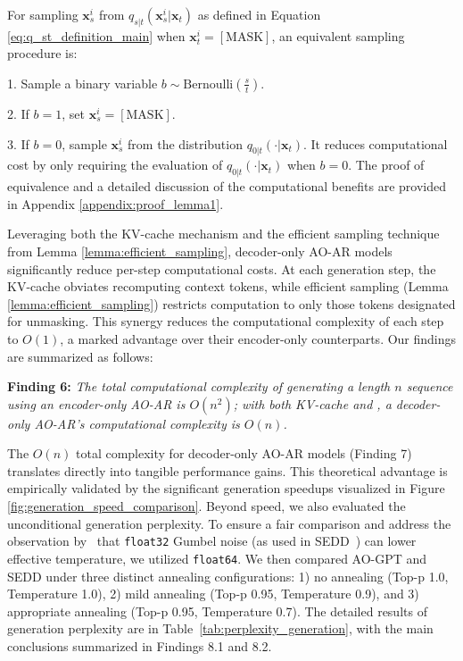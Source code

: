 \begin{lemma} \label{lemma:efficient_sampling}
For sampling $\boldsymbol{x}_s^i$ from $q_{s|t}(\boldsymbol{x}_s^i|\boldsymbol{x}_t)$ as defined in Equation \eqref{eq:q_st_definition_main} when $\boldsymbol{x}_t^i = [\text{MASK}]$, an equivalent sampling procedure is:

\hspace{10mm} 1. Sample a binary variable $b \sim \text{Bernoulli}\left(\frac{s}{t}\right)$.

\hspace{10mm} 2. If $b=1$, set $\boldsymbol{x}_s^i = [\text{MASK}]$.

\hspace{10mm} 3. If $b=0$, sample $\boldsymbol{x}_s^i$ from the distribution $q_{0|t}(\cdot | \boldsymbol{x}_t)$.
It reduces computational cost by only requiring the evaluation of $q_{0|t}(\cdot | \boldsymbol{x}_t)$ when $b=0$. The proof of equivalence and a detailed discussion of the computational benefits are provided in Appendix \ref{appendix:proof_lemma1}.
\end{lemma}
Leveraging both the KV-cache mechanism and the efficient sampling technique from Lemma \ref{lemma:efficient_sampling}, decoder-only AO-AR models significantly reduce per-step computational costs. At each generation step, the KV-cache obviates recomputing context tokens, while efficient sampling (Lemma \ref{lemma:efficient_sampling}) restricts computation to only those tokens designated for unmasking. This synergy reduces the computational complexity of each step to $O(1)$, a marked advantage over their encoder-only counterparts. Our findings are summarized as follows:
\begin{tcolorbox}[
    enhanced,
    colback=LightGoldenrodYellow!40,
    colframe=black!20,
    arc=2mm, 
    boxrule=0.5pt, 
    boxsep=0mm,
    before skip=2mm,
    after skip=2mm
]
\textbf{Finding 6:} \textit{The total computational complexity of generating a length $n$ sequence using an encoder-only AO-AR is $O(n^2)$; with both KV-cache and , a decoder-only AO-AR's computational complexity is $O(n)$.}
\end{tcolorbox}
The $O(n)$ total complexity for decoder-only AO-AR models (Finding 7) translates directly into tangible performance gains. This theoretical advantage is empirically validated by the significant generation speedups visualized in Figure \ref{fig:generation_speed_comparison}. Beyond speed, we also evaluated the unconditional generation perplexity. To ensure a fair comparison and address the observation by~\cite{zheng2024masked} that \texttt{float32} Gumbel noise (as used in SEDD~\cite{lou2023discrete}) can lower effective temperature, we utilized \texttt{float64}. We then compared AO-GPT and SEDD under three distinct annealing configurations: 1) no annealing (Top-p 1.0, Temperature 1.0), 2) mild annealing (Top-p 0.95, Temperature 0.9), and 3) appropriate annealing (Top-p 0.95, Temperature 0.7). The detailed results of generation perplexity are in Table~\ref{tab:perplexity_generation}, with the main conclusions summarized in Findings 8.1 and 8.2.
